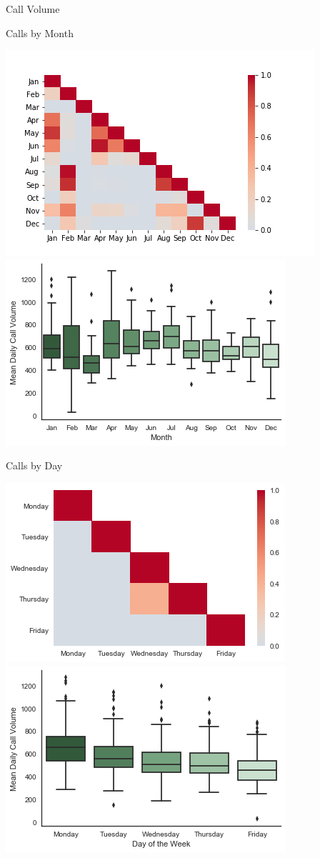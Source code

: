 \documentclass{beamer}
\begin{document}
\begin{frame}{Call Volume}
	\begin{center}
		Calls by Month
	\end{center}
    \includegraphics[scale=0.3]{heatmap}
    \includegraphics[scale=0.3]{monthly_boxplot}
    \begin{center}
    	Calls by Day
    \end{center}
    \includegraphics[scale=0.3]{daily_heatmap}
    \includegraphics[scale=0.3]{daily_call_boxplot}
\end{frame}
 
\end{document}
